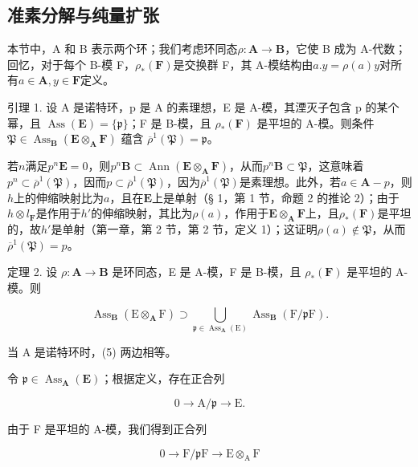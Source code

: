 \subsection{准素分解与纯量扩张}

本节中，A 和 B 表示两个环；我们考虑环同态\(\rho: \mathbf{A} \to \mathbf{B}\)，它使 B 成为 A-代数；回忆，对于每个 B-模 F，\(\rho_*(\mathbf{F})\)是交换群 F，其 A-模结构由\(a.y = \rho(a)y\)对所有\(a \in \mathbf{A}, y \in \mathbf{F}\)定义。

引理 1. 设 A 是诺特环，p 是 A 的素理想，E 是 A-模，其湮灭子包含 p 的某个幂，且 \(\operatorname{Ass}(\mathbf{E}) = \{\mathfrak{p}\}\)；F 是 B-模，且 \(\rho_{*}(\mathbf{F})\) 是平坦的 A-模。则条件 \(\mathfrak{P} \in \operatorname{Ass}_{\mathbf{B}}(\mathbf{E} \otimes_{\mathbf{A}} \mathbf{F})\) 蕴含 \(\overline{\rho}^{1}(\mathfrak{P}) = \mathfrak{p}\)。

若\(n\)满足\(p^n\mathbf{E} = 0\)，则\(p^n\mathbf{B} \subset \operatorname{Ann}(\mathbf{E} \otimes_{\mathbf{A}} \mathbf{F})\)，从而\(p^n\mathbf{B} \subset \mathfrak{P}\)，这意味着\(p^n \subset \overline{\rho}^1(\mathfrak{P})\)，因而\(p \subset \overline{\rho}^1(\mathfrak{P})\)，因为\(\overline{\rho}^1(\mathfrak{P})\)是素理想。此外，若\(a \in \mathbf{A} - p\)，则\(h\)上的伸缩映射比为\(a\)，且在\(\mathbf{E}\)上是单射（§ 1，第 1 节，命题 2 的推论 2）；由于\(h \otimes l_{\mathbf{F}}\)是作用于\(h'\)的伸缩映射，其比为\(\rho(a)\)，作用于\(\mathbf{E} \otimes_{\mathbf{A}} \mathbf{F}\)上，且\(\rho_*(\mathbf{F})\)是平坦的，故\(h'\)是单射（第一章，第 2 节，第 2 节，定义 1）；这证明\(\rho(a) \notin \mathfrak{P}\)，从而\(\overline{\rho}^1(\mathfrak{P}) = p\)。

定理 2. 设 \(\rho: \mathbf{A} \to \mathbf{B}\) 是环同态，E 是 A-模，F 是 B-模，且 \(\rho_*(\mathbf{F})\) 是平坦的 A-模。则

\[
\operatorname{Ass} _ {\mathbf {B}} (\mathrm{E} \otimes_ {\mathbf {A}} \mathrm{F}) \supset \bigcup_ {\mathfrak {p} \in \operatorname{Ass} _ {\mathbf {A}} (\mathrm{E})} \operatorname{Ass} _ {\mathbf {B}} (\mathrm{F} / \mathfrak {p} \mathrm{F}).\tag{5}
\]

当 A 是诺特环时，(5) 两边相等。

令 \(\mathfrak{p} \in \operatorname{Ass}_{\mathbf{A}}(\mathbf{E})\)；根据定义，存在正合列

\[
0 \rightarrow \mathrm{A} / \mathfrak {p} \rightarrow \mathrm{E}.
\]

由于 F 是平坦的 A-模，我们得到正合列

\[
0 \rightarrow \mathrm{F} / \mathfrak {p} \mathrm{F} \rightarrow \mathrm{E} \otimes_ {\mathrm{A}} \mathrm{F}
\]

